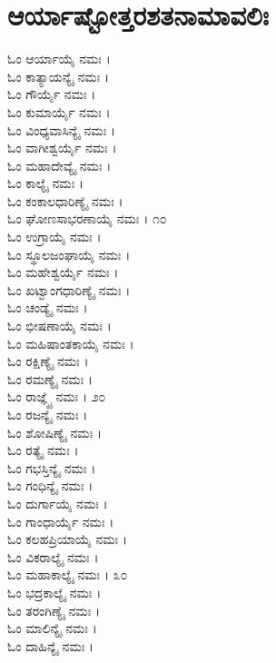 \section{ಆರ್ಯಾಷ್ಟೋತ್ತರಶತನಾಮಾವಲಿಃ}
\begin{multicols}{2}
ಓಂ ಆರ್ಯಾಯೈ ನಮಃ ।\\
ಓಂ ಕಾತ್ಯಾಯನ್ಯೈ ನಮಃ ।\\
ಓಂ ಗೌರ್ಯೈ ನಮಃ ।\\
ಓಂ ಕುಮಾರ್ಯೈ ನಮಃ ।\\
ಓಂ ವಿಂಧ್ಯವಾಸಿನ್ಯೈ ನಮಃ ।\\
ಓಂ ವಾಗೀಶ್ವರ್ಯೈ ನಮಃ ।\\
ಓಂ ಮಹಾದೇವ್ಯೈ ನಮಃ ।\\
ಓಂ ಕಾಲ್ಯೈ ನಮಃ ।\\
ಓಂ ಕಂಕಾಲಧಾರಿಣ್ಯೈ ನಮಃ ।\\
ಓಂ ಘೋಣಸಾಭರಣಾಯೈ ನಮಃ । ೧೦\\
ಓಂ ಉಗ್ರಾಯೈ ನಮಃ ।\\
ಓಂ ಸ್ಥೂಲಜಂಘಾಯೈ ನಮಃ ।\\
ಓಂ ಮಹೇಶ್ವರ್ಯೈ ನಮಃ ।\\
ಓಂ ಖಟ್ವಾಂಗಧಾರಿಣ್ಯೈ ನಮಃ ।\\
ಓಂ ಚಂಡ್ಯೈ ನಮಃ ।\\
ಓಂ ಭೀಷಣಾಯೈ ನಮಃ ।\\
ಓಂ ಮಹಿಷಾಂತಕಾಯೈ ನಮಃ ।\\
ಓಂ ರಕ್ಷಿಣ್ಯೈ ನಮಃ ।\\
ಓಂ ರಮಣ್ಯೈ ನಮಃ ।\\
ಓಂ ರಾಜ್ಞ್ಯೈ ನಮಃ । ೨೦\\
ಓಂ ರಜನ್ಯೈ ನಮಃ ।\\
ಓಂ ಶೋಷಿಣ್ಯೈ ನಮಃ ।\\
ಓಂ ರತ್ಯೈ ನಮಃ ।\\
ಓಂ ಗಭಸ್ತಿನ್ಯೈ ನಮಃ ।\\
ಓಂ ಗಂಧಿನ್ಯೈ ನಮಃ ।\\
ಓಂ ದುರ್ಗಾಯೈ ನಮಃ ।\\
ಓಂ ಗಾಂಧಾರ್ಯೈ ನಮಃ ।\\
ಓಂ ಕಲಹಪ್ರಿಯಾಯೈ ನಮಃ ।\\
ಓಂ ವಿಕರಾಲ್ಯೈ ನಮಃ ।\\
ಓಂ ಮಹಾಕಾಲ್ಯೈ ನಮಃ । ೩೦\\
ಓಂ ಭದ್ರಕಾಲ್ಯೈ ನಮಃ ।\\
ಓಂ ತರಂಗಿಣ್ಯೈ ನಮಃ ।\\
ಓಂ ಮಾಲಿನ್ಯೈ ನಮಃ ।\\
ಓಂ ದಾಹಿನ್ಯೈ ನಮಃ ।\\

\end{multicols}
